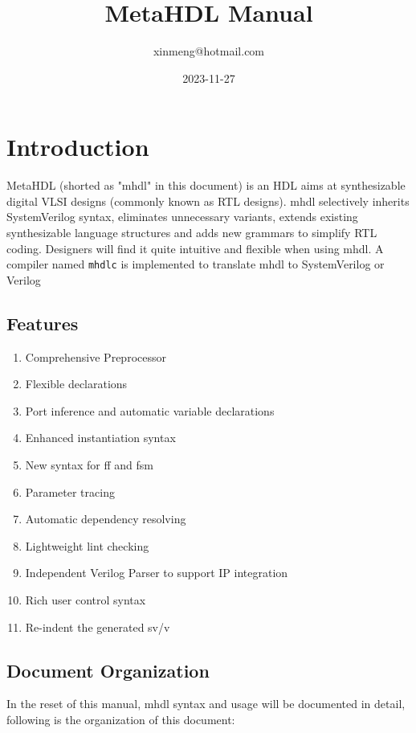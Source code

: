 \documentclass[10pt,oneside]{book}
\author{xinmeng@hotmail.com}
\date{2023-11-27}
\title{MetaHDL Manual}
\begin{document}
\maketitle
\tableofcontents


\chapter{Introduction}
\label{sec:org00340b3}
MetaHDL (shorted as "mhdl" in this document) is an HDL aims at
synthesizable digital VLSI designs (commonly known as RTL designs).
mhdl selectively inherits SystemVerilog
syntax, eliminates unnecessary variants, extends existing
synthesizable language structures and adds new grammars to simplify
RTL coding.  Designers will find it quite intuitive and flexible when
using mhdl.  A compiler named \texttt{mhdlc} is implemented to translate mhdl
to SystemVerilog or Verilog

\section{Features}
\label{sec:orgc968f7e}
\begin{enumerate}
\item Comprehensive Preprocessor

\item Flexible declarations

\item Port inference and automatic variable declarations

\item Enhanced instantiation syntax

\item New syntax for ff and fsm

\item Parameter tracing

\item Automatic dependency resolving

\item Lightweight lint checking

\item Independent Verilog Parser to support IP integration

\item Rich user control syntax

\item Re-indent the generated sv/v
\end{enumerate}

\section{Document Organization}
\label{sec:org71a7d4f}
In the reset of this manual, mhdl syntax and usage will be documented in
detail, following is the organization of this document:
\end{document}
